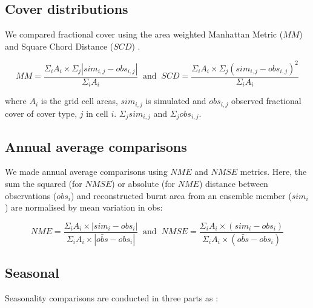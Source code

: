 \documentclass[bg, manuscript]{copernicus}
\begin{document}
\subsection{Cover distributions}
We compared fractional cover using the area weighted Manhattan Metric ($MM$) and Square Chord Distance ($SCD$) \citep{Kelley2013-ey}.

\begin{equation}
    MM = \frac{\Sigma_i A_i \times \Sigma_j  |sim_{i,j} - obs_{i,j} |}{\Sigma_i A_i} \  \text{   and   } \
    SCD = \frac{\Sigma_i A_i \times \Sigma_j (sim_{i,j} - obs_{i,j} )^2}{\Sigma_i A_i}
\end{equation}

where $A_i$ is the grid cell areas, $sim_{i,j}$ is simulated and $obs_{i,j}$ observed fractional cover of cover type, $j$ in cell $i$. $\Sigma_j sim_{i,j}$ and $\Sigma_j obs_{i,j}$.

\subsection{Annual average comparisons}
We made annual average comparisons using $NME$ and $NMSE$ metrics. Here, the sum the squared (for $NMSE$) or absolute (for $NME$) distance between observations ($obs_i$) and reconstructed burnt area from an ensemble member ($sim_i$) are normalised by mean variation in obs:

\begin{equation}
    NME = \frac{\Sigma_i A_i \times  |sim_i - obs_i |}{\Sigma_i A_i \times |\bar{obs} - obs_i |} \  \text{   and   } \
    NMSE = \frac{\Sigma_i A_i \times  (sim_i- obs_i) }{\Sigma_i A_i \times (\bar{obs} - obs_i )}
\end{equation}

\subsection{Seasonal}
Seasonality comparisons are conducted in three parts as  \citet{kelley2013comprehensive, kelley2021low}:
\end{document}
